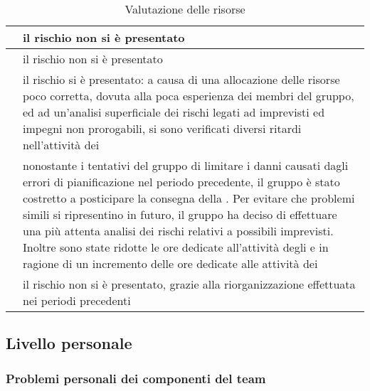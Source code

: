 \documentclass[PianoDiProgetto.tex]{subfiles}
\begin{document}
\begin{table}[h]
\begin{center}
\begin{tabular}{ | c | p{10cm} |}
				\\ \hline \textbf{\PerAR} & il rischio non si è presentato
				\\ \hline \textbf{\PerAD}& il rischio non si è presentato
				\\ \hline \textbf{\PerPA}& il rischio si è presentato: a causa di una allocazione delle risorse poco corretta, dovuta alla poca esperienza dei membri del gruppo, ed ad un'analisi superficiale dei rischi legati ad imprevisti ed impegni non prorogabili, si sono verificati diversi ritardi nell'attività dei \PJP{}
				\\ \hline \textbf{\PerPD}& nonostante i tentativi del gruppo di limitare i danni causati dagli errori di pianificazione nel periodo precedente, il gruppo è stato costretto a posticipare la consegna della \RP.
        Per evitare che problemi simili si ripresentino in futuro, il gruppo ha deciso di effettuare una più attenta analisi dei rischi relativi a possibili imprevisti.
        Inoltre sono state ridotte le ore dedicate all'attività degli \ANP{} e \VERP{} in ragione di un incremento delle ore dedicate alle attività dei \PJP{} \\ \hline
        		\textbf{\PerC}& il rischio non si è presentato, grazie alla riorganizzazione effettuata nei periodi precedenti \\
				\hline
		\end{tabular}
		\caption{Valutazione delle risorse}
		\end{center}
	\end{table}

	\clearpage
	\subsection{Livello personale}
		\subsubsection{Problemi personali dei componenti del team}
			\label{sec:ppdct}
\end{document}
